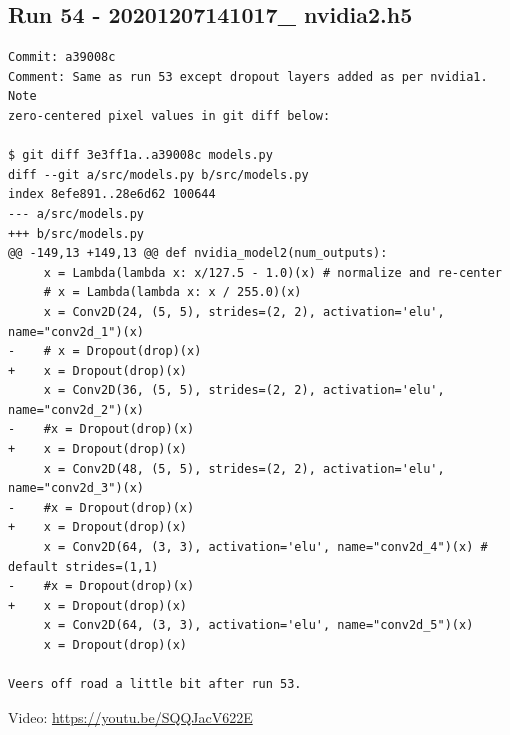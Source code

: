 \subsection{Run 54 - 20201207141017\_ nvidia2.h5}
\label{app_res:54}
\begin{verbatim}
Commit: a39008c
Comment: Same as run 53 except dropout layers added as per nvidia1. Note
zero-centered pixel values in git diff below:

$ git diff 3e3ff1a..a39008c models.py
diff --git a/src/models.py b/src/models.py
index 8efe891..28e6d62 100644
--- a/src/models.py
+++ b/src/models.py
@@ -149,13 +149,13 @@ def nvidia_model2(num_outputs):
     x = Lambda(lambda x: x/127.5 - 1.0)(x) # normalize and re-center
     # x = Lambda(lambda x: x / 255.0)(x)
     x = Conv2D(24, (5, 5), strides=(2, 2), activation='elu', name="conv2d_1")(x)
-    # x = Dropout(drop)(x)
+    x = Dropout(drop)(x)
     x = Conv2D(36, (5, 5), strides=(2, 2), activation='elu', name="conv2d_2")(x)
-    #x = Dropout(drop)(x)
+    x = Dropout(drop)(x)
     x = Conv2D(48, (5, 5), strides=(2, 2), activation='elu', name="conv2d_3")(x)
-    #x = Dropout(drop)(x)
+    x = Dropout(drop)(x)
     x = Conv2D(64, (3, 3), activation='elu', name="conv2d_4")(x) # default strides=(1,1)
-    #x = Dropout(drop)(x)
+    x = Dropout(drop)(x)
     x = Conv2D(64, (3, 3), activation='elu', name="conv2d_5")(x)
     x = Dropout(drop)(x)

Veers off road a little bit after run 53.
\end{verbatim}
Video: \url{https://youtu.be/SQQJacV622E}

